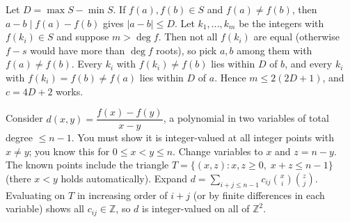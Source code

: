 \documentclass[11pt,a4paper]{article}
\begin{document}
 Let $D=\max S-\min S$. If $f(a),f(b)\in S$ and $f(a)\ne f(b)$, then $a-b\mid f(a)-f(b)$ gives $|a-b|\le D$.
 Let $k_1,\dots,k_m$ be the integers with $f(k_i)\in S$ and suppose $m>\deg f$. Then not all $f(k_i)$ are equal (otherwise $f-s$ would have more than $\deg f$ roots), so pick $a,b$ among them with $f(a)\ne f(b)$.
 Every $k_i$ with $f(k_i)\ne f(b)$ lies within $D$ of $b$, and every $k_i$ with $f(k_i)=f(b)\ne f(a)$ lies within $D$ of $a$. Hence $m\le2(2D+1)$, and $c=4D+2$ works.

 Consider $d(x,y)=\dfrac{f(x)-f(y)}{x-y}$, a polynomial in two variables of total degree $\le n-1$. You must show it is integer-valued at all integer points with $x\ne y$; you know this for $0\le x<y\le n$.
 Change variables to $x$ and $z=n-y$. The known points include the triangle $T=\{(x,z):x,z\ge0,\;x+z\le n-1\}$ (there $x<y$ holds automatically).
 Expand $d=\sum_{i+j\le n-1}c_{ij}\binom xi\binom zj$. Evaluating on $T$ in increasing order of $i+j$ (or by finite differences in each variable) shows all $c_{ij}\in\mathbb{Z}$, so $d$ is integer-valued on all of $\mathbb{Z}^2$.
\end{document}
